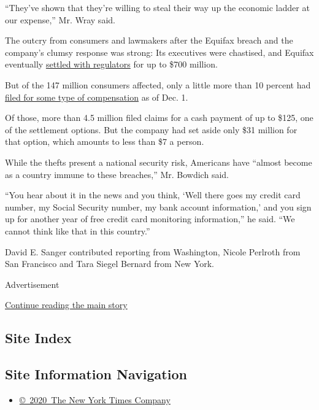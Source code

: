 ``They've shown that they're willing to steal their way up the economic
ladder at our expense,'' Mr. Wray said.

The outcry from consumers and lawmakers after the Equifax breach and the
company's clumsy response was strong: Its executives were chastised, and
Equifax eventually
\href{https://www.nytimes.com/2019/07/22/business/equifax-settlement.html}{settled
with regulators} for up to \$700 million.

But of the 147 million consumers affected, only a little more than 10
percent had
\href{https://www.nytimes.com/2020/01/22/business/equifax-breach-settlement.html}{filed
for some type of compensation} as of Dec. 1.

Of those, more than 4.5 million filed claims for a cash payment of up to
\$125, one of the settlement options. But the company had set aside only
\$31 million for that option, which amounts to less than \$7 a person.

While the thefts present a national security risk, Americans have
``almost become as a country immune to these breaches,'' Mr. Bowdich
said.

``You hear about it in the news and you think, `Well there goes my
credit card number, my Social Security number, my bank account
information,' and you sign up for another year of free credit card
monitoring information,'' he said. ``We cannot think like that in this
country.''

David E. Sanger contributed reporting from Washington, Nicole Perlroth
from San Francisco and Tara Siegel Bernard from New York.

Advertisement

\protect\hyperlink{after-bottom}{Continue reading the main story}

\hypertarget{site-index}{%
\subsection{Site Index}\label{site-index}}

\hypertarget{site-information-navigation}{%
\subsection{Site Information
Navigation}\label{site-information-navigation}}

\begin{itemize}
\tightlist
\item
  \href{https://help.nytimes.com/hc/en-us/articles/115014792127-Copyright-notice}{©~2020~The
  New York Times Company}
\end{itemize}

